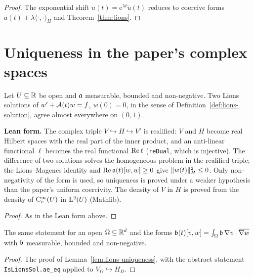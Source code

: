 \begin{proof}
  \leanok
  The exponential shift $u(t)=\mathrm{e}^{\lambda t}\tilde u(t)$ reduces to coercive forms
  $a(t)+\lambda\langle\cdot,\cdot\rangle_H$ and Theorem~\ref{thm:lions}.
\end{proof}

\section{Uniqueness in the paper's complex spaces}

\begin{lemma}
  \label{lem:lions-uniqueness}
  \leanok
  Let $U\subseteq\mathbb{R}$ be open and $\mathfrak{a}$ measurable, bounded and non-negative.  Two Lions solutions
  of $w'+\mathcal{A}(t)w=f$, $w(0)=0$, in the sense of Definition~\ref{def:lions-solution}, agree
  almost everywhere on $(0,1)$.
\end{lemma}

\textbf{Lean form.}  The complex triple $V\hookrightarrow H\hookrightarrow V'$ is realified: $V$
and $H$ become real Hilbert spaces with the real part of the inner product, and an
anti-linear functional $\ell$ becomes the real functional $\operatorname{Re}\ell$ (\texttt{reDual}, which is
injective).  The difference of two solutions solves the homogeneous problem in the realified
triple; the Lions--Magenes identity and $\operatorname{Re}\mathfrak{a}(t)[w,w]\geq0$ give $\lVert w(t)\rVert_H^2\leq0$.  Only
non-negativity of the form is used, so uniqueness is proved under a weaker hypothesis than the
paper's uniform coercivity.  The density of $V$ in $H$ is proved from the density of
$\mathrm{C}_c^\infty(U)$ in $\mathrm{L}^2(U)$ (Mathlib).

\begin{proof}
  \leanok
  As in the Lean form above.
\end{proof}

\begin{lemma}
  \label{lem:lions-uniqueness-domain}
  \leanok
  The same statement for an open $\Omega\subseteq\mathbb{R}^d$ and the forms
  $\mathfrak{b}(t)[v,w]=\int_\Omega\mathfrak{b}\,\nabla v\cdot\overline{\nabla w}$ with $\mathfrak{b}$ measurable, bounded and
  non-negative.
\end{lemma}

\begin{proof}
  \leanok
  The proof of Lemma~\ref{lem:lions-uniqueness}, with the abstract statement
  \texttt{IsLionsSol.ae\_eq} applied to $V_\Omega\hookrightarrow H_\Omega$.
\end{proof}
